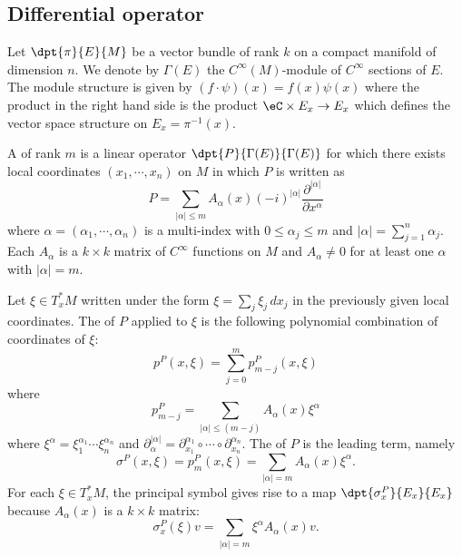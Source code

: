 \subsection{Differential operator}

Let $\dpt{ \pi }{ E }{ M }$ be a vector bundle of rank $k$ on a compact manifold of dimension $n$. We denote by $\Gamma(E)$ the $ C^{\infty}(M)$-module of $ C^{\infty}$ sections of $E$. The module structure is given by $(f\cdot\psi)(x)=f(x)\psi(x)$ where the product in the right hand side is the product $\eC\times E_x\to E_x$ which defines the vector space structure on $E_x=\pi^{-1}(x)$.

A  of rank $m$  is a linear operator $\dpt{ P }{ \Gamma(E) }{ \Gamma(E) }$ for which there exists local coordinates $(x_1,\cdots,x_n)$ on $M$ in which $P$ is written as
\begin{equation}
	P=\sum_{| \alpha |\leq m}A_{\alpha}(x)(-i)^{| \alpha |}\frac{ \partial^{| \alpha |} }{ \partial x^{\alpha} }
\end{equation}
where $\alpha=(\alpha_1,\cdots,\alpha_n)$ is a multi-index with $0\leq\alpha_j\leq m$ and $| \alpha |=\sum_{j=1}^n\alpha_j$. Each $A_{\alpha}$ is a $k\times k$ matrix of $ C^{\infty}$ functions on $M$ and $A_{\alpha}\neq 0$ for at least one $\alpha$ with $| \alpha |=m$.

Let $\xi\in T^*_xM$ written under the form $\xi=\sum_j\xi_j\,dx_j$ in the previously given local coordinates. The  of $P$ applied to $\xi$ is the following polynomial combination of coordinates of $\xi$:
\begin{equation}
	p^P(x,\xi)=\sum_{j=0}^m p^P_{m-j}(x,\xi)
\end{equation}
where
\[
	p^P_{m-j}=\sum_{| \alpha |\leq(m-j)}A_{\alpha}(x)\xi^{\alpha}
\]
where $\xi^{\alpha}=\xi_1^{\alpha_1}\cdots\xi_n^{\alpha_n}$ and $\partial^{| \alpha |}_{\alpha}=\partial_{x_1}^{\alpha_1}\circ\cdots\circ\partial^{\alpha_n}_{x_n}$.  The  of $P$ is the leading term, namely
\begin{equation}
	\sigma^P(x,\xi)=p^P_m(x,\xi)=\sum_{| \alpha |=m}A_{\alpha}(x)\xi^{\alpha}.
\end{equation}
For each $\xi\in T^*_xM$, the principal symbol gives rise to a map $\dpt{ \sigma_x^P }{ E_x }{ E_x }$ because $A_{\alpha}(x)$ is a $k\times k$ matrix:
\[
	\sigma_x^P(\xi)v=\sum_{| \alpha |=m}\xi^{\alpha}A_{\alpha}(x)v.
\]

